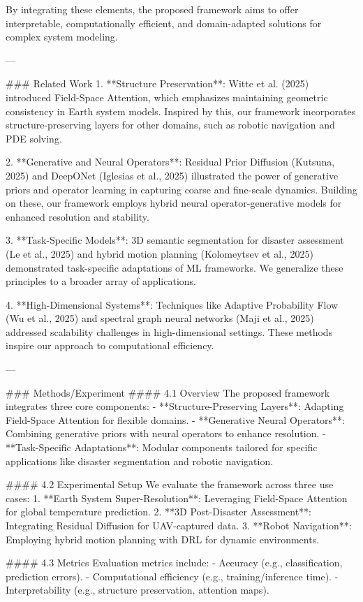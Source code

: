 By integrating these elements, the proposed framework aims to offer interpretable, computationally efficient, and domain-adapted solutions for complex system modeling.

---

### Related Work  
1. **Structure Preservation**: Witte et al. (2025) introduced Field-Space Attention, which emphasizes maintaining geometric consistency in Earth system models. Inspired by this, our framework incorporates structure-preserving layers for other domains, such as robotic navigation and PDE solving.  

2. **Generative and Neural Operators**: Residual Prior Diffusion (Kutsuna, 2025) and DeepONet (Iglesias et al., 2025) illustrated the power of generative priors and operator learning in capturing coarse and fine-scale dynamics. Building on these, our framework employs hybrid neural operator-generative models for enhanced resolution and stability.  

3. **Task-Specific Models**: 3D semantic segmentation for disaster assessment (Le et al., 2025) and hybrid motion planning (Kolomeytsev et al., 2025) demonstrated task-specific adaptations of ML frameworks. We generalize these principles to a broader array of applications.  

4. **High-Dimensional Systems**: Techniques like Adaptive Probability Flow (Wu et al., 2025) and spectral graph neural networks (Maji et al., 2025) addressed scalability challenges in high-dimensional settings. These methods inspire our approach to computational efficiency.  

---

### Methods/Experiment  
#### 4.1 Overview  
The proposed framework integrates three core components:  
- **Structure-Preserving Layers**: Adapting Field-Space Attention for flexible domains.  
- **Generative Neural Operators**: Combining generative priors with neural operators to enhance resolution.  
- **Task-Specific Adaptations**: Modular components tailored for specific applications like disaster segmentation and robotic navigation.  

#### 4.2 Experimental Setup  
We evaluate the framework across three use cases:  
1. **Earth System Super-Resolution**: Leveraging Field-Space Attention for global temperature prediction.  
2. **3D Post-Disaster Assessment**: Integrating Residual Diffusion for UAV-captured data.  
3. **Robot Navigation**: Employing hybrid motion planning with DRL for dynamic environments.

#### 4.3 Metrics  
Evaluation metrics include:  
- Accuracy (e.g., classification, prediction errors).  
- Computational efficiency (e.g., training/inference time).  
- Interpretability (e.g., structure preservation, attention maps).  

